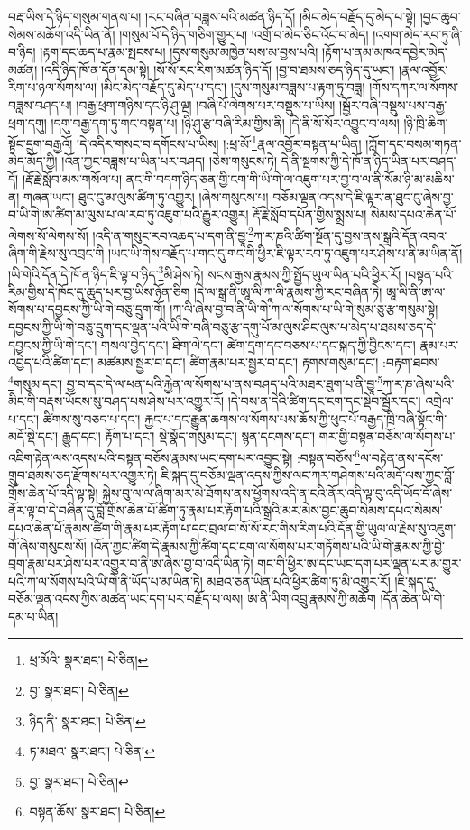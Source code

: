 བརྡ་ཡིས་དེ་ཉིད་གསུམ་གནས་པ། །རང་བཞིན་བཟླས་པའི་མཚན་ཉིད་དོ། །མིང་མེད་བརྗོད་དུ་མེད་པ་སྟེ། །བྱང་ཆུབ་སེམས་མཆོག་འདི་ཡིན་ནོ། །གསུམ་པོ་དེ་ཉིད་གཅིག་གྱུར་པ། །འགྲོ་བ་མེད་ཅིང་འོང་བ་མེད། །འགག་མེད་རབ་ཏུ་ཞི་བ་ཉིད། །རྟག་དང་ཆད་པ་རྣམ་སྤངས་པ། །དུས་གསུམ་མཁྱེན་པས་མ་བྱས་པའི། །རྟོག་པ་ནམ་མཁའ་དབྱེར་མེད་མཚན། །འདི་ཉིད་ཁོ་ན་དོན་དམ་སྟེ། །སོ་སོ་རང་རིག་མཚན་ཉིད་དོ། །བྱ་བ་ཐམས་ཅད་ཉིད་དུ་ཡང་། །རྣལ་འབྱོར་རིག་པ་ཉལ་སོགས་ལ། །མིང་མེད་བརྗོད་དུ་མེད་པ་དང་། །དུས་གསུམ་བཟླས་པ་རྟག་ཏུ་བཟླ། །གོས་དཀར་ལ་སོགས་བཟླས་བཤད་པ། །བརྒྱ་ཕྲག་གཉིས་དང་ཉི་ཤུ་ལྔ། །བཞི་པོ་ལེགས་པར་བསྡུས་པ་ཡིས། །སྦྱོར་བཞི་བསྡུས་པས་བརྒྱ་ཕྲག་དགུ། །དགུ་བརྒྱ་དག་ཏུ་གང་བསྟན་པ། །ཉི་ཤུ་རྩ་བཞི་རིམ་གྱིས་ནི། །དེ་ནི་སོ་སོར་འབྱུང་བ་ལས། །ཉི་ཁྲི་ཆིག་སྟོང་དྲུག་བརྒྱའོ། །དེ་འདིར་གསང་བ་དགོངས་པ་ཡིས། །:ཕྲ་མོ་\footnote{ཕྲ་མོའི་  སྣར་ཐང་།  པེ་ཅིན། }རྣལ་འབྱོར་བསྟན་པ་ཡིན། །ཀློག་དང་བསམ་གཏན་མེད་མོད་ཀྱི། །འོན་ཀྱང་བཟླས་པ་ཡིན་པར་བཤད། །ཅེས་གསུངས་ཏེ། དེ་ནི་སྔགས་ཀྱི་དེ་ཁོ་ན་ཉིད་ཡིན་པར་བཤད་དོ། །རྡོ་རྗེ་སློབ་མས་གསོལ་པ། ནང་གི་བདག་ཉིད་ཅན་གྱི་ངག་གི་ཡི་གེ་ལ་འཇུག་པར་བྱ་བ་ལ་ནི་སོམ་ཉི་མ་མཆིས་ན། གཞན་ཡང་། ཐུང་ངུ་མ་ལུས་ཚིག་ཏུ་འགྱུར། །ཞེས་གསུངས་པ། བཅོམ་ལྡན་འདས་དེ་ཇི་ལྟར་ན་ཐུང་ངུ་ཞེས་བྱ་བ་ཡི་གེ་ཨ་ཚིག་མ་ལུས་པ་ལ་རབ་ཏུ་འཇུག་པའི་རྒྱུར་འགྱུར། རྡོ་རྗེ་སློབ་དཔོན་གྱིས་སྨྲས་པ། སེམས་དཔའ་ཆེན་པོ་ལེགས་སོ་ལེགས་སོ། །འདི་ན་གསུང་རབ་འཆད་པ་དག་ནི་བྱཱ་\footnote{བྱ་  སྣར་ཐང་།  པེ་ཅིན། }ཀ་ར་ཎའི་ཚིག་སྔོན་དུ་བྱས་ནས་སྒྲའི་དོན་འབའ་ཞིག་གི་རྗེས་སུ་འབྲང་གི །ཡང་ཡི་གེས་བརྗོད་པ་གང་དུ་གང་གི་ཕྱིར་ཇི་ལྟར་རབ་ཏུ་འཇུག་པར་ཤེས་པ་ནི་མ་ཡིན་ནོ། །ཡི་གེའི་དོན་དེ་ཁོ་ན་ཉིད་ཇི་ལྟ་བ་ཉིད་\footnote{ཉིད་ནི་  སྣར་ཐང་།  པེ་ཅིན། }མི་ཤེས་ཏེ། སངས་རྒྱས་རྣམས་ཀྱི་སྤྱོད་ཡུལ་ཡིན་པའི་ཕྱིར་རོ། །བསྟན་པའི་རིམ་གྱིས་དེ་ཁོང་དུ་ཆུད་པར་བྱ་ཡིས་ཉོན་ཅིག །དེ་ལ་སྒྲ་ནི་ཨཱ་ལི་ཀཱ་ལི་རྣམས་ཀྱི་རང་བཞིན་ཏེ། ཨཱ་ལི་ནི་ཨ་ལ་སོགས་པ་དབྱངས་ཀྱི་ཡི་གེ་བཅུ་དྲུག་གོ། །ཀཱ་ལི་ཞེས་བྱ་བ་ནི་ཡི་གེ་ཀ་ལ་སོགས་པ་ཡི་གེ་སུམ་ཅུ་རྩ་གསུམ་སྟེ། དབྱངས་ཀྱི་ཡི་གེ་བཅུ་དྲུག་དང་ལྡན་པའི་ཡི་གེ་བཞི་བཅུ་རྩ་དགུ་པོ་མ་ལུས་ཤིང་ལུས་པ་མེད་པ་ཐམས་ཅད་དེ་དབྱངས་ཀྱི་ཡི་གེ་དང་། གསལ་བྱེད་དང་། ཐིག་ལེ་དང་། ཚེག་དྲག་དང་བཅས་པ་དང་སྐད་ཀྱི་བྱིངས་དང་། རྣམ་པར་འབྱེད་པའི་ཚིག་དང་། མཚམས་སྦྱར་བ་དང་། ཚིག་རྣམ་པར་སྦྱར་བ་དང་། རྟགས་གསུམ་དང་། :བརྟག་ཐབས་\footnote{ཏ་མཐའ་  སྣར་ཐང་།  པེ་ཅིན། }གསུམ་དང་། བྱ་བ་དང་དེ་ལ་ཕན་པའི་རྐྱེན་ལ་སོགས་པ་ནས་བཤད་པའི་མཐར་ཐུག་པ་ནི་བྱཱ་\footnote{བྱ་  སྣར་ཐང་།  པེ་ཅིན། }ཀ་ར་ཎ་ཞེས་པའི་མིང་གི་བརྡས་ཡོངས་སུ་བཤད་པས་ཤེས་པར་འགྱུར་རོ། །དེ་བས་ན་དེའི་ཚིག་དང་ངག་དང་སྡེབ་སྦྱོར་དང་། འགྲེལ་པ་དང་། ཚིགས་སུ་བཅད་པ་དང་། རྐྱང་པ་དང་རྒྱུན་ཆགས་ལ་སོགས་པས་ཆོས་ཀྱི་ཕུང་པོ་བརྒྱད་ཁྲི་བཞི་སྟོང་གི་མདོ་སྡེ་དང་། རྒྱུད་དང་། རྟོག་པ་དང་། སྡེ་སྣོད་གསུམ་དང་། སྙན་དངགས་དང་། གར་གྱི་བསྟན་བཅོས་ལ་སོགས་པ་འཇིག་རྟེན་ལས་འདས་པའི་བསྟན་བཅོས་རྣམས་ཡང་དག་པར་འབྱུང་སྟེ། :བསྟན་བཅོས་\footnote{བསྟན་ཆོས་  སྣར་ཐང་།  པེ་ཅིན། }ལ་བརྟེན་ནས་དངོས་གྲུབ་ཐམས་ཅད་རྫོགས་པར་འགྱུར་ཏེ། ཇི་སྐད་དུ་བཅོམ་ལྡན་འདས་ཀྱིས་ལང་ཀར་གཤེགས་པའི་མདོ་ལས་ཀྱང་བློ་གྲོས་ཆེན་པོ་འདི་ལྟ་སྟེ། སྐྱེས་བུ་ལ་ལ་ཞིག་མར་མེ་ཐོགས་ནས་ཕྱོགས་འདི་ན་ངའི་ནོར་འདི་ལྟ་བུ་འདི་ཡོད་དོ་ཞེས་ནོར་ལྟ་བ་དེ་བཞིན་དུ་བློ་གྲོས་ཆེན་པོ་ཚིག་ཏུ་རྣམ་པར་རྟོག་པའི་སྒྲའི་མར་མེས་བྱང་ཆུབ་སེམས་དཔའ་སེམས་དཔའ་ཆེན་པོ་རྣམས་ཚིག་གི་རྣམ་པར་རྟོག་པ་དང་བྲལ་བ་སོ་སོ་རང་གིས་རིག་པའི་དོན་གྱི་ཡུལ་ལ་རྗེས་སུ་འཇུག་གོ་ཞེས་གསུངས་སོ། །འོན་ཀྱང་ཚིག་དེ་རྣམས་ཀྱི་ཚིག་དང་ངག་ལ་སོགས་པར་གཏོགས་པའི་ཡི་གེ་རྣམས་ཀྱི་བྱེ་བྲག་རྣམ་པར་ཤེས་པར་འགྱུར་བ་ནི་ཨ་ཞེས་བྱ་བ་འདི་ཡིན་ཏེ། གང་གི་ཕྱིར་ཨ་དང་ཡང་དག་པར་ལྡན་པར་མ་གྱུར་པའི་ཀ་ལ་སོགས་པའི་ཡི་གེ་ནི་ཡོད་པ་མ་ཡིན་ཏེ། མཐའ་ཅན་ཡིན་པའི་ཕྱིར་ཚིག་ཏུ་མི་འགྱུར་རོ། །ཇི་སྐད་དུ་བཅོམ་ལྡན་འདས་ཀྱིས་མཚན་ཡང་དག་པར་བརྗོད་པ་ལས། ཨ་ནི་ཡིག་འབྲུ་རྣམས་ཀྱི་མཆོག །དོན་ཆེན་ཡི་གེ་དམ་པ་ཡིན། 